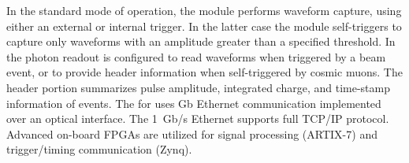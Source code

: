 
In the standard mode of operation, the module performs waveform capture, using either an external or internal trigger. In the latter case the module self-triggers to capture only waveforms with an amplitude greater than a specified threshold. In  the photon readout is configured to read waveforms when triggered by a beam event, or to provide header information when self-triggered by cosmic muons.
The header portion summarizes pulse amplitude, integrated charge, and time-stamp information of events. The  for  uses \si{Gb} Ethernet 
communication implemented over an optical interface. The \SI{1}{Gb/s} Ethernet supports full TCP/IP protocol.  Advanced on-board FPGAs are utilized for signal processing (ARTIX-7) and trigger/timing communication (Zynq).


